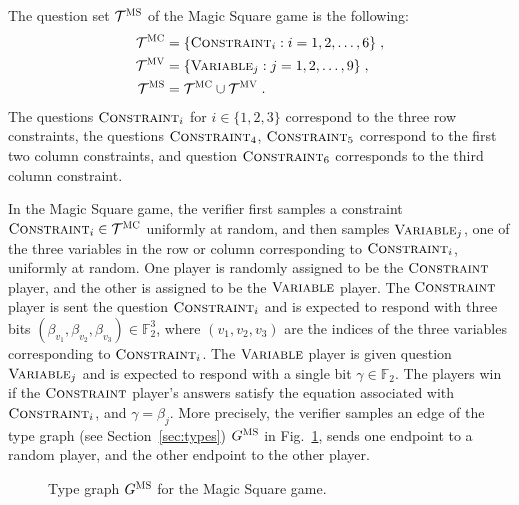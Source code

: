 \documentclass[11pt]{article}
\theoremstyle{definition}
\newcommand{\F}{\ensuremath{\mathbb{F}}}
\newcommand{\type}{\mathcal{T}}
\newcommand{\gamestyle}[1]{\ensuremath{\textsc{#1}}\xspace}
\newcommand{\ms}{\gamestyle{MS}}
\newcommand{\labelstyle}[1]{\ensuremath{\textsc{#1}}\xspace}
\newcommand{\msc}{\labelstyle{MC}}
\newcommand{\msv}{\labelstyle{MV}}
\newcommand{\typestyle}[1]{\ensuremath{\textsc{#1}}\xspace}
\newcommand{\Constraint}{\typestyle{Constraint}}
\newcommand{\Variable}{\typestyle{Variable}}
\begin{document}
The question set $\type^\ms$ of the Magic Square game is the following:
\begin{equation*}
  \begin{split}
    \type^\msc & = \{ \Constraint_i : i = 1, 2, \ldots, 6\}\;,\\
    \type^\msv & = \{ \Variable_j : j = 1, 2, \ldots, 9\}\;,\\
    \type^\ms & = \type^\msc \cup \type^\msv\;.
  \end{split}
\end{equation*}
The questions $\Constraint_i$ for $i \in \{1,2,3\}$ correspond to the three row
constraints, the questions $\Constraint_4$, $\Constraint_5$ correspond to the first
two column constraints, and question $\Constraint_6$ corresponds to the third
column constraint.

In the Magic Square game, the verifier first samples a constraint $\Constraint_i
\in \type^\msc$ uniformly at random, and then samples $\Variable_j$, one of the
three variables in the row or column corresponding to $\Constraint_i$, uniformly
at random.
One player is randomly assigned to be the $\Constraint$ player, and the other is
assigned to be the $\Variable$ player.
The $\Constraint$ player is sent the question $\Constraint_i$ and is expected to
respond with three bits $(\beta_{v_1}, \beta_{v_2}, \beta_{v_3}) \in \F_2^3$,
where $(v_1,v_2,v_3)$ are the indices of the three variables corresponding to
$\Constraint_i$.
The $\Variable$ player is given question $\Variable_j$ and is expected to
respond with a single bit $\gamma \in \F_2$.
The players win if the $\Constraint$ player's answers satisfy the equation
associated with $\Constraint_i$, and $\gamma = \beta_j$.
More precisely, the verifier samples an edge of the type graph (see Section~\ref{sec:types}) $G^\ms$
in Fig.~\ref{fig:type-graph-ms}, sends one endpoint to a random player, and the
other endpoint to the other player.

\begin{figure}[!htbp]
  \centering
  \caption{Type graph $G^\ms$ for the Magic Square game.  }
  \label{fig:type-graph-ms}
\end{figure}
\end{document}
